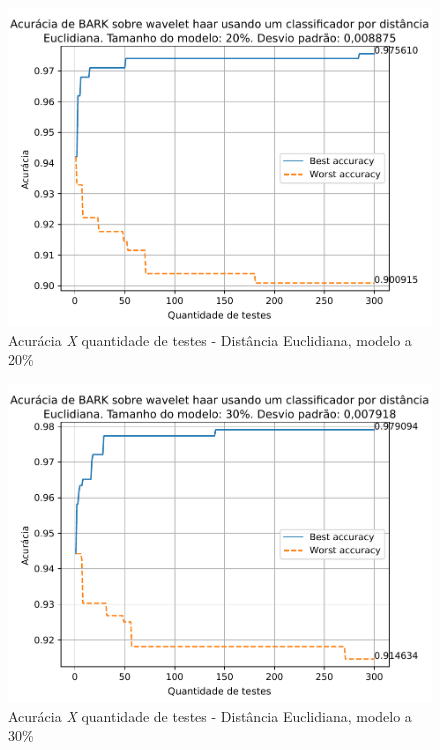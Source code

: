 		\newpage
		\begin{figure}
			\centering
			\includegraphics{images/results/confusionMatrices/classifier_Euclidian_20}
			\caption{Acurácia \textit{X} quantidade de testes - Distância Euclidiana, modelo a 20\%}
			\label{fig:classifiereuclidian20}
		\end{figure}
		
	
		\newpage
		\begin{figure}
			\centering
			\includegraphics{images/results/confusionMatrices/classifier_Euclidian_30}
			\caption{Acurácia \textit{X} quantidade de testes - Distância Euclidiana, modelo a 30\%}
			\label{fig:classifiereuclidian30}
		\end{figure}
		
	
